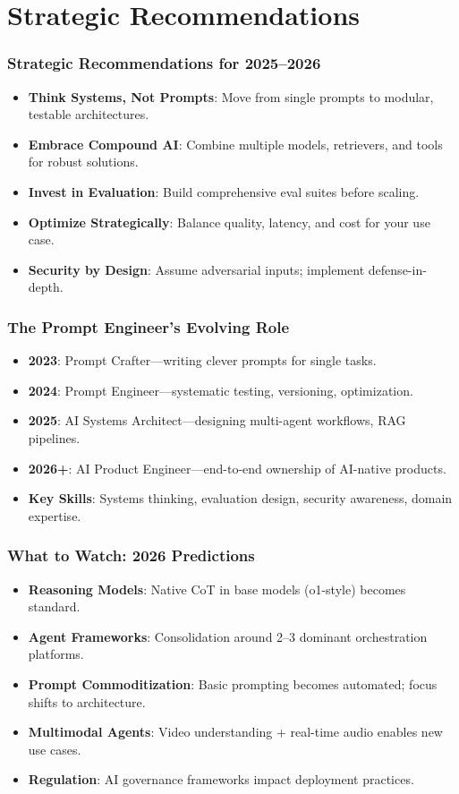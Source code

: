 \documentclass{beamer}
\begin{document}
\section{Strategic Recommendations}

\begin{frame}
    \frametitle{Strategic Recommendations for 2025--2026}
    \begin{itemize}
        \item \textbf{Think Systems, Not Prompts}: Move from single prompts to modular, testable architectures.
        \item \textbf{Embrace Compound AI}: Combine multiple models, retrievers, and tools for robust solutions.
        \item \textbf{Invest in Evaluation}: Build comprehensive eval suites before scaling.
        \item \textbf{Optimize Strategically}: Balance quality, latency, and cost for your use case.
        \item \textbf{Security by Design}: Assume adversarial inputs; implement defense-in-depth.
    \end{itemize}
\end{frame}

\begin{frame}
    \frametitle{The Prompt Engineer's Evolving Role}
    \begin{itemize}
        \item \textbf{2023}: Prompt Crafter---writing clever prompts for single tasks.
        \item \textbf{2024}: Prompt Engineer---systematic testing, versioning, optimization.
        \item \textbf{2025}: AI Systems Architect---designing multi-agent workflows, RAG pipelines.
        \item \textbf{2026+}: AI Product Engineer---end-to-end ownership of AI-native products.
        \item \textbf{Key Skills}: Systems thinking, evaluation design, security awareness, domain expertise.
    \end{itemize}
\end{frame}

\begin{frame}
    \frametitle{What to Watch: 2026 Predictions}
    \begin{itemize}
        \item \textbf{Reasoning Models}: Native CoT in base models (o1-style) becomes standard.
        \item \textbf{Agent Frameworks}: Consolidation around 2--3 dominant orchestration platforms.
        \item \textbf{Prompt Commoditization}: Basic prompting becomes automated; focus shifts to architecture.
        \item \textbf{Multimodal Agents}: Video understanding + real-time audio enables new use cases.
        \item \textbf{Regulation}: AI governance frameworks impact deployment practices.
    \end{itemize}
\end{frame}
\end{document}
